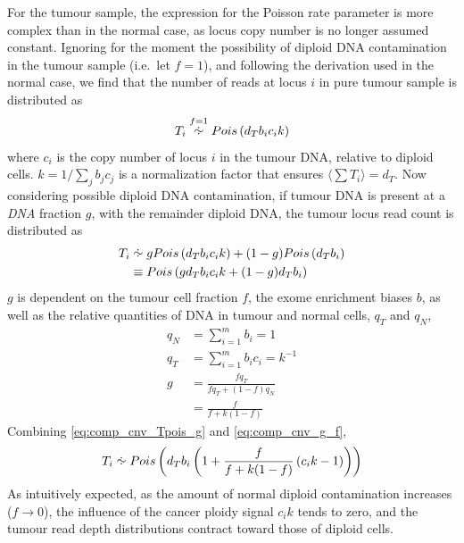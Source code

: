 \documentclass[thesis.tex]{subfiles}
\begin{document}
For the tumour sample, the expression for the Poisson rate parameter is more complex than in the normal case, as locus copy number is no longer assumed constant.  Ignoring for the moment the possibility of diploid DNA contamination in the tumour sample (i.e.\ let $f = 1$), and following the derivation used in the normal case, we find that the number of reads at locus $i$ in pure tumour sample is distributed as
\begin{equation}
  T_i \overset{f = 1}{\approxdist} Pois\left(d_T b_i c_i k \right)
  \label{eq:comp_cnv_Tpois_pure}
\end{equation}
where $c_i$ is the copy number of locus $i$ in the tumour DNA, relative to diploid cells.  $k = 1/\sum_{j} b_j c_j$ is a normalization factor that ensures $\langle \sum T_i \rangle = d_T$.  Now considering possible diploid DNA contamination, if tumour DNA is present at a \emph{DNA} fraction $g$, with the remainder diploid DNA, the tumour locus read count is distributed as
\begin{align}
  T_i &\approxdist g Pois\left(d_T b_i c_i k \right) + (1-g) Pois\left(d_T b_i\right) \\
      &\equiv Pois\left(g d_T b_i c_i k + (1-g) d_T b_i\right) \label{eq:comp_cnv_Tpois_g}
\end{align}
$g$ is dependent on the tumour cell fraction $f$, the exome enrichment biases $b$, as well as the relative quantities of DNA in tumour and normal cells, $q_T$ and $q_N$,
\begin{align}
  q_N &= \sum_{i=1}^m b_i = 1 \\
  q_T &= \sum_{i=1}^m b_i c_i = k^{-1}\\
  g &= \frac{f q_T}{f q_T + (1-f) q_N} \\
    &= \frac{f}{f + k\left(1-f\right)} \label{eq:comp_cnv_g_f}
\end{align}
Combining \ref{eq:comp_cnv_Tpois_g} and \ref{eq:comp_cnv_g_f},
\begin{equation}
  T_i \approxdist Pois\left(d_T b_i \left(1 + \frac{f}{f + k(1-f)} \left(c_i k - 1\right) \right) \right)
\end{equation}
As intuitively expected, as the amount of normal diploid contamination increases ($f \to 0$), the influence of the cancer ploidy signal $c_i k$ tends to zero, and the tumour read depth distributions contract toward those of diploid cells.
\end{document}
